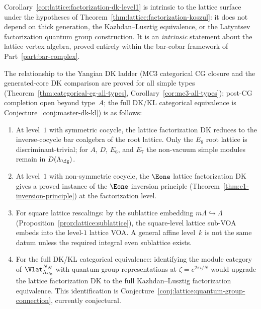 \begin{remark}
\label{rem:lattice:factorization-dk-comparison}
Corollary~\ref{cor:lattice:factorization-dk-level1} is intrinsic to
the lattice surface under the hypotheses of
Theorem~\ref{thm:lattice:factorization-koszul}: it does not depend on thick generation, the
Kazhdan--Lusztig equivalence, or the Latyntsev factorization
quantum group construction. It is an \emph{intrinsic} statement
about the lattice vertex algebra, proved entirely within the
bar-cobar framework of Part~\ref{part:bar-complex}.

The relationship to the Yangian DK ladder
(MC3 categorical CG closure and the generated-core DK comparison are
proved for all simple types
\textup{(}Theorem~\ref{thm:categorical-cg-all-types},
Corollary~\ref{cor:mc3-all-types}\textup{)}; post-CG completion open
beyond type~$A$; the full DK/KL categorical
equivalence is Conjecture~\ref{conj:master-dk-kl}) is as follows:
\begin{enumerate}[label=\textup{(\alph*)}]
\item At level~$1$ with symmetric cocycle, the lattice factorization
 DK reduces to the inverse-cocycle bar coalgebra of the root lattice.
 Only the $E_8$ root lattice is discriminant-trivial; for $A$, $D$,
 $E_6$, and $E_7$ the non-vacuum simple modules remain in
 $D(\Lambda_\fg)$.

\item At level~$1$ with non-symmetric cocycle, the $\Eone$ lattice
 factorization DK gives a proved instance of the $\Eone$ inversion
 principle (Theorem~\ref{thm:e1-inversion-principle}) at the
 factorization level.

\item For square lattice rescalings: by the sublattice embedding
 $m\Lambda \hookrightarrow \Lambda$
 (Proposition~\ref{prop:lattice:sublattice}), the square-level
 lattice sub-VOA embeds into the level-$1$ lattice VOA. A general
 affine level~$k$ is not the same datum unless the required integral
 even sublattice exists.

\item For the full DK/KL categorical equivalence: identifying the module category of
 $\Vlat_{\Lambda_\fg}^{N,q}$ with quantum group representations
 at $\zeta = e^{2\pi i/N}$ would upgrade the lattice
 factorization DK to the full Kazhdan--Lusztig factorization
 equivalence. This identification is
 Conjecture~\ref{conj:lattice:quantum-group-connection}, currently
 conjectural.
\end{enumerate}


\end{remark}
